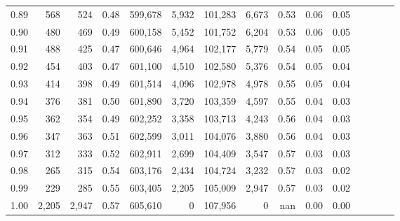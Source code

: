 \begin{tabular}{rrrcrrrrrrrrrrr}
0.89 &     568 &    524 &                                       0.48 &  599,678 &    5,932 &  101,283 &    6,673 &  0.53 &  0.06 &                         0.05 \\
0.90 &     480 &    469 &                                       0.49 &  600,158 &    5,452 &  101,752 &    6,204 &  0.53 &  0.06 &                         0.05 \\
0.91 &     488 &    425 &                                       0.47 &  600,646 &    4,964 &  102,177 &    5,779 &  0.54 &  0.05 &                         0.05 \\
0.92 &     454 &    403 &                                       0.47 &  601,100 &    4,510 &  102,580 &    5,376 &  0.54 &  0.05 &                         0.04 \\
0.93 &     414 &    398 &                                       0.49 &  601,514 &    4,096 &  102,978 &    4,978 &  0.55 &  0.05 &                         0.04 \\
0.94 &     376 &    381 &                                       0.50 &  601,890 &    3,720 &  103,359 &    4,597 &  0.55 &  0.04 &                         0.03 \\
0.95 &     362 &    354 &                                       0.49 &  602,252 &    3,358 &  103,713 &    4,243 &  0.56 &  0.04 &                         0.03 \\
0.96 &     347 &    363 &                                       0.51 &  602,599 &    3,011 &  104,076 &    3,880 &  0.56 &  0.04 &                         0.03 \\
0.97 &     312 &    333 &                                       0.52 &  602,911 &    2,699 &  104,409 &    3,547 &  0.57 &  0.03 &                         0.03 \\
0.98 &     265 &    315 &                                       0.54 &  603,176 &    2,434 &  104,724 &    3,232 &  0.57 &  0.03 &                         0.02 \\
0.99 &     229 &    285 &                                       0.55 &  603,405 &    2,205 &  105,009 &    2,947 &  0.57 &  0.03 &                         0.02 \\
1.00 &   2,205 &  2,947 &                                       0.57 &  605,610 &        0 &  107,956 &        0 &   nan &  0.00 &                         0.00 \\
\bottomrule
\end{tabular}
